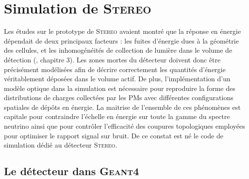 

\chapter{Simulation de \textsc{Stereo}}
\label{chap:chapitre_3}


\minitoc

\newpage

Les études sur le prototype de \textsc{Stereo} avaient montré que la réponse en énergie dépendait de deux principaux facteurs : les fuites d'énergie dues à la géométrie des cellules, et les inhomogénéités de collection de lumière dans le volume de détection  (\cite{bonhomme:tel-01931309}, chapitre 3). Les zones mortes du détecteur doivent donc être précisément modélisées afin de décrire correctement les quantités d'énergie véritablement déposées dans le volume actif. De plus, l'implémentation d'un modèle optique dans la simulation est nécessaire pour reproduire la forme des distributions de charges collectées par les PMs avec différentes configurations spatiales de dépôts en énergie. La maitrise de l'ensemble de ces phénomènes est capitale pour contraindre l'échelle en énergie sur toute la gamme du spectre neutrino ainsi que pour contrôler l'efficacité des coupures topologiques employées pour optimiser le rapport signal sur bruit. De ce constat est né le code de simulation dédié au détecteur \textsc{Stereo}. \\

\section{Le détecteur dans \textsc{Geant4}}

